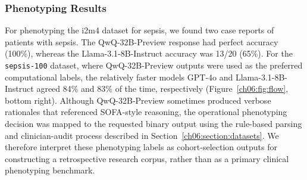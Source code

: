 \subsubsection{Phenotyping Results}
For phenotyping the i2m4 dataset for sepsis, we found two case reports of patients with sepsis.
The QwQ-32B-Preview response had perfect accuracy (100\%), whereas the Llama-3.1-8B-Instruct accuracy was 13/20 (65\%).
For the \texttt{sepsis-100} dataset, where QwQ-32B-Preview outputs were used as the preferred computational labels, the relatively faster models GPT-4o and Llama-3.1-8B-Instruct agreed 84\% and 83\% of the time, respectively (Figure~\ref{ch06:fig:flow}, bottom right).
Although QwQ-32B-Preview sometimes produced verbose rationales that referenced SOFA-style reasoning, the operational phenotyping decision was mapped to the requested binary output using the rule-based parsing and clinician-audit process described in Section~\ref{ch06:section:datasets}.
We therefore interpret these phenotyping labels as cohort-selection outputs for constructing a retrospective research corpus, rather than as a primary clinical phenotyping benchmark.

